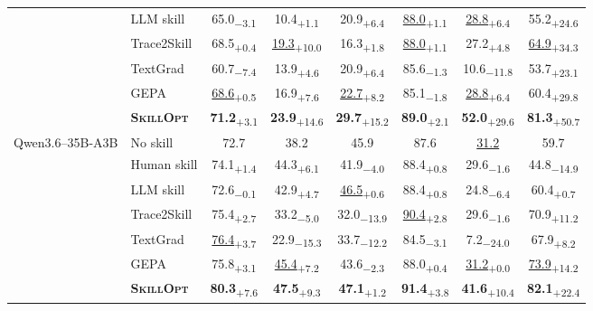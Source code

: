 \documentclass{llmxive}
\providecommand{\ourmethod}{\textsc{SkillOpt}\xspace}
\providecommand{\dvalp}[2]{\hphantom{\textsubscript{+#2}}#1\textsubscript{+#2}}
\providecommand{\dvaln}[2]{\hphantom{\textsubscript{$-$#2}}#1\textsubscript{$-$#2}}
\providecommand{\methodcell}[1]{\cellcolor{blue!8}#1}
\begin{document}
\begin{table}[!htbp]
\begin{tabular}{l l c c c c c c}
 & LLM skill & \dvaln{65.0}{3.1} & \dvalp{10.4}{1.1} & \dvalp{20.9}{6.4} & \dvalp{\underline{88.0}}{1.1} & \dvalp{\underline{28.8}}{6.4} & \dvalp{55.2}{24.6} \\
 & Trace2Skill & \dvalp{68.5}{0.4} & \dvalp{\underline{19.3}}{10.0} & \dvalp{16.3}{1.8} & \dvalp{\underline{88.0}}{1.1} & \dvalp{27.2}{4.8} & \dvalp{\underline{64.9}}{34.3} \\
 & TextGrad & \dvaln{60.7}{7.4} & \dvalp{13.9}{4.6} & \dvalp{20.9}{6.4} & \dvaln{85.6}{1.3} & \dvaln{10.6}{11.8} & \dvalp{53.7}{23.1} \\
 & GEPA & \dvalp{\underline{68.6}}{0.5} & \dvalp{16.9}{7.6} & \dvalp{\underline{22.7}}{8.2} & \dvaln{85.1}{1.8} & \dvalp{\underline{28.8}}{6.4} & \dvalp{60.4}{29.8} \\
 & \methodcell{\textbf{\ourmethod{}}} & \methodcell{\dvalp{\textbf{71.2}}{3.1}} & \methodcell{\dvalp{\textbf{23.9}}{14.6}} & \methodcell{\dvalp{\textbf{29.7}}{15.2}} & \methodcell{\dvalp{\textbf{89.0}}{2.1}} & \methodcell{\dvalp{\textbf{52.0}}{29.6}} & \methodcell{\dvalp{\textbf{81.3}}{50.7}} \\
\cmidrule(lr){1-8}
\multirow{7}{*}{Qwen3.6--35B-A3B} & No skill & 72.7 & 38.2 & 45.9 & 87.6 & \underline{31.2} & 59.7 \\
 & Human skill & \dvalp{74.1}{1.4} & \dvalp{44.3}{6.1} & \dvaln{41.9}{4.0} & \dvalp{88.4}{0.8} & \dvaln{29.6}{1.6} & \dvaln{44.8}{14.9} \\
 & LLM skill & \dvaln{72.6}{0.1} & \dvalp{42.9}{4.7} & \dvalp{\underline{46.5}}{0.6} & \dvalp{88.4}{0.8} & \dvaln{24.8}{6.4} & \dvalp{60.4}{0.7} \\
 & Trace2Skill & \dvalp{75.4}{2.7} & \dvaln{33.2}{5.0} & \dvaln{32.0}{13.9} & \dvalp{\underline{90.4}}{2.8} & \dvaln{29.6}{1.6} & \dvalp{70.9}{11.2} \\
 & TextGrad & \dvalp{\underline{76.4}}{3.7} & \dvaln{22.9}{15.3} & \dvaln{33.7}{12.2} & \dvaln{84.5}{3.1} & \dvaln{7.2}{24.0} & \dvalp{67.9}{8.2} \\
 & GEPA & \dvalp{75.8}{3.1} & \dvalp{\underline{45.4}}{7.2} & \dvaln{43.6}{2.3} & \dvalp{88.0}{0.4} & \dvalp{\underline{31.2}}{0.0} & \dvalp{\underline{73.9}}{14.2} \\
 & \methodcell{\textbf{\ourmethod{}}} & \methodcell{\dvalp{\textbf{80.3}}{7.6}} & \methodcell{\dvalp{\textbf{47.5}}{9.3}} & \methodcell{\dvalp{\textbf{47.1}}{1.2}} & \methodcell{\dvalp{\textbf{91.4}}{3.8}} & \methodcell{\dvalp{\textbf{41.6}}{10.4}} & \methodcell{\dvalp{\textbf{82.1}}{22.4}} \\
\midrule

\end{tabular}
\end{table}
\end{document}
